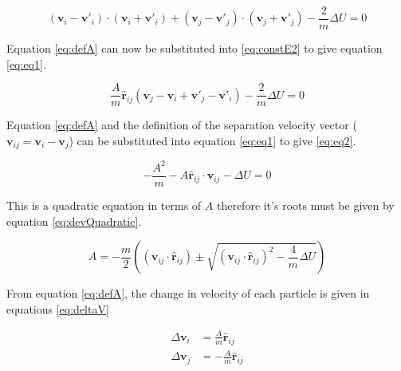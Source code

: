 \documentclass[12pt]{UoAthesis}
\begin{document}
\begin{equation}
  \label{eq:constE2}
  (\mathbf{v}_i - \mathbf{v}'_i)\cdot(\mathbf{v}_i + \mathbf{v}'_i) +
  (\mathbf{v}_j - \mathbf{v}'_j)\cdot(\mathbf{v}_j + \mathbf{v}'_j) -
  \frac{2}{m}\Delta U = 0
\end{equation}

Equation \eqref{eq:defA} can now be substituted into
\eqref{eq:constE2} to give equation \eqref{eq:eq1}.

\begin{equation}
  \label{eq:eq1}
  \frac{A}{m}\mathbf{\hat{r}}_{ij} (\mathbf{v}_j - \mathbf{v}_i 
  + \mathbf{v}'_j - \mathbf{v}'_i) - \frac{2}{m}\Delta U = 0
\end{equation}

Equation \eqref{eq:defA} and the definition of the separation velocity
vector ($\mathbf{v}_{ij} = \mathbf{v}_i - \mathbf{v}_j$) can be
substituted into equation \eqref{eq:eq1} to give \eqref{eq:eq2}.

\begin{equation}
  \label{eq:eq2}
  -\frac{A^2}{m}
  -A\mathbf{\hat{r}}_{ij}\cdot\mathbf{v}_{ij} - \Delta U = 0
\end{equation}

This is a quadratic equation in terms of $A$ therefore it's roots must
be given by equation \eqref{eq:devQuadratic}.

\begin{equation}
  \label{eq:devQuadratic}
  A = -\frac{m}{2}\left((\mathbf{v}_{ij}\cdot\mathbf{\hat{r}}_{ij}) \pm
  \sqrt{(\mathbf{v}_{ij}\cdot\mathbf{\hat{r}}_{ij})^2 - \frac{4}{m}\Delta U}\right)
\end{equation}  

From equation \eqref{eq:defA}, the change in velocity of each particle
is given in equations \eqref{eq:deltaV}

\begin{subequations}
  \label{eq:deltaV}
  \begin{align}
    \Delta\mathbf{v}_i &= \frac{A}{m} \mathbf{\hat{r}}_{ij} \\
    \Delta\mathbf{v}_j &= -\frac{A}{m}\mathbf{\hat{r}}_{ij}    
  \end{align}
\end{subequations}
\end{document}
